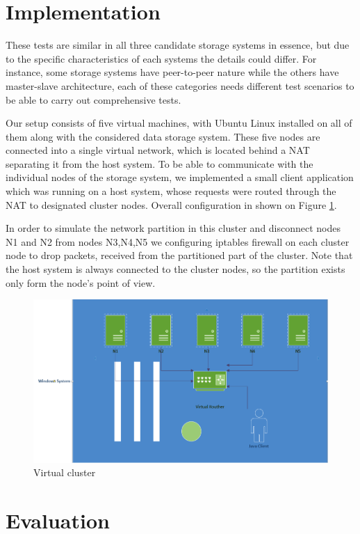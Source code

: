 \documentclass[a4paper]{article}
\begin{document}
\section{Implementation}

These tests are similar in all three candidate storage systems in essence, but due to the specific characteristics of each systems the details could differ. 
For instance, some storage systems have peer-to-peer nature while the others have master-slave architecture, each of these categories needs different test scenarios to be able to carry out comprehensive tests.

Our setup consists of five virtual machines, with Ubuntu Linux installed on all of them along with the considered data storage system. 
These five nodes are connected into a single virtual network, which is located behind a NAT separating it from the host system.
To be able to communicate with the individual nodes of the storage system, we implemented a small client application which was running on a host system, whose requests were routed through the NAT to designated cluster nodes. 
Overall configuration in shown on Figure \ref{fig:cluster}. 

In order to simulate the network partition in this cluster and disconnect nodes N1 and N2 from nodes N3,N4,N5 we configuring iptables firewall on each cluster node to drop packets, received from the partitioned part of the cluster.
Note that the host system is always connected to the cluster nodes, so the partition exists only form the node's point of view.

\begin{figure}[h!]
	\centering
	\includegraphics[width=\textwidth]{cluster}
	\caption{Virtual cluster}
	\label{fig:cluster}
\end{figure}

\section{Evaluation}
\end{document}
